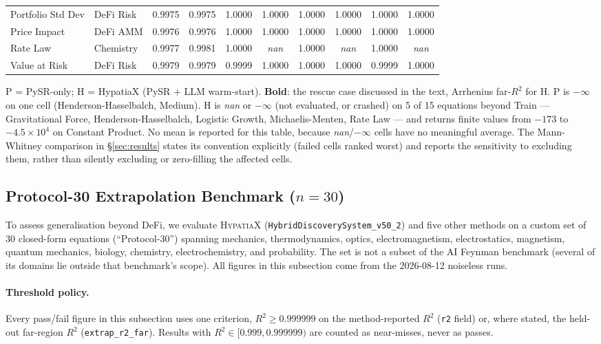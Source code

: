 \documentclass[twoside,11pt]{article}
\newcommand{\Rsq}{R^{2}}
\begin{document}
\begin{table}[htbp]
{\begin{tabular}{llcccccccc}
Portfolio Std Dev & DeFi Risk & 0.9975 & 0.9975 & 1.0000 & 1.0000 & 1.0000 & 1.0000 & 1.0000 & 1.0000 \\
Price Impact & DeFi AMM & 0.9976 & 0.9976 & 1.0000 & 1.0000 & 1.0000 & 1.0000 & 1.0000 & 1.0000 \\
Rate Law & Chemistry & 0.9977 & 0.9981 & 1.0000 & \textit{nan} & 1.0000 & \textit{nan} & 1.0000 & \textit{nan} \\
Value at Risk & DeFi Risk & 0.9979 & 0.9979 & 0.9999 & 1.0000 & 1.0000 & 1.0000 & 0.9999 & 1.0000 \\
\bottomrule
\end{tabular}%
}%
\par\vspace{4pt}
{\footnotesize\noindent
P = PySR-only; H = HypatiaX (PySR + LLM warm-start). \textbf{Bold}: the rescue case discussed in the text,
Arrhenius far-$R^2$ for H. P is $-\infty$ on one cell (Henderson-Hasselbalch, Medium). H is \textit{nan}
or $-\infty$ (not evaluated, or crashed) on 5 of 15 equations beyond Train ---
Gravitational Force, Henderson-Hasselbalch, Logistic Growth,
Michaelis-Menten, Rate Law --- and returns finite values from $-173$ to
$-4.5\times10^{4}$ on Constant Product. No mean is reported for this table, because
\textit{nan}/$-\infty$ cells have no meaningful average. The Mann-Whitney comparison in
§\ref{sec:results} states its convention explicitly (failed cells ranked worst) and
reports the sensitivity to excluding them, rather than silently excluding or
zero-filling the affected cells.
}
\end{table}

\subsection{Protocol-30 Extrapolation Benchmark ($n=30$)}\label{subsec:feynman-extrapolation-benchmark-n30}
\label{sec:feynman30}

To assess generalisation beyond DeFi, we evaluate \textsc{HypatiaX}
(\texttt{HybridDiscoverySystem\_v50\_2}) and five other methods on a custom set of 30 closed-form
equations (``Protocol-30'') spanning mechanics, thermodynamics, optics, electromagnetism,
electrostatics, magnetism, quantum mechanics, biology, chemistry,
electrochemistry, and probability. The set is not a subset of the AI Feynman
benchmark (several of its domains lie outside that benchmark's scope). All figures in this subsection come from
the 2026-08-12 noiseless runs.

\paragraph{Threshold policy.} Every pass/fail figure in this subsection uses
one criterion, $\Rsq \geq 0.999999$ on the method-reported $\Rsq$ (\texttt{r2} field) or, where stated, the
held-out far-region $\Rsq$ (\texttt{extrap\_r2\_far}).
Results with $\Rsq \in [0.999, 0.999999)$ are counted as near-misses, never as
passes.
\end{document}

